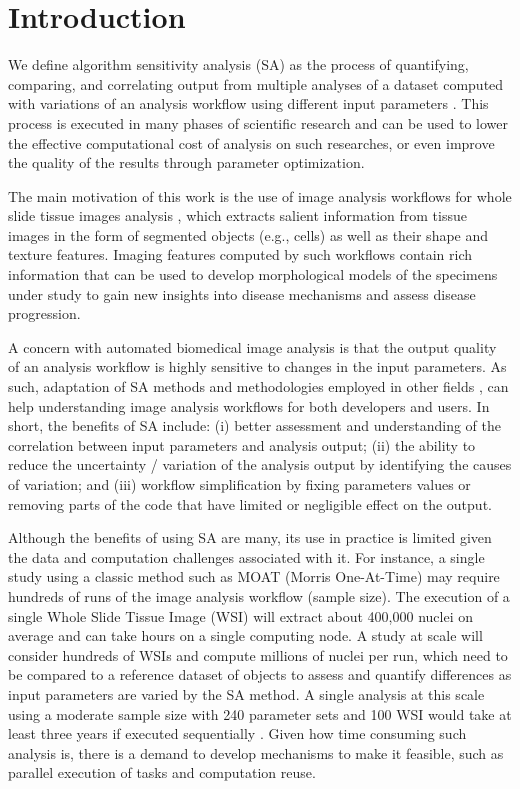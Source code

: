 \section{Introduction}

We define algorithm sensitivity analysis (SA) as the process of quantifying, comparing, and correlating output from multiple analyses of a dataset computed with variations of an analysis workflow using different input parameters \cite{sa}. This process is executed in many phases of scientific research and can be used to lower the effective computational cost of analysis on such researches, or even improve the quality of the results through parameter optimization.

The main motivation of this work is the use of image analysis workflows for whole slide tissue images analysis \cite{motiv1}, which extracts salient information from tissue images in the form of segmented objects (e.g., cells) as well as their shape and texture features. Imaging features computed by such workflows contain rich information that can be used to develop morphological models of the specimens under study to gain new insights into disease mechanisms and assess disease progression.

A concern with automated biomedical image analysis is that the output quality of an analysis workflow is highly sensitive to changes in the input parameters. As such, adaptation of SA methods and methodologies employed in other fields \cite{moat,vbd,motiv2,motiv3}, can help understanding image analysis workflows for both developers and users. In short, the benefits of SA include: (i) better assessment and understanding of the correlation between input parameters and analysis output; (ii) the ability to reduce the uncertainty / variation of the analysis output by identifying the causes of variation; and (iii) workflow simplification by fixing parameters values or removing parts of the code that have limited or negligible effect on the output.

Although the benefits of using SA are many, its use in practice is limited given the data and computation challenges associated with it. For instance, a single study using a classic method such as MOAT (Morris One-At-Time) \cite{moat} may require hundreds of runs of the image analysis workflow (sample size). The execution of a single Whole Slide Tissue Image (WSI) will extract about 400,000 nuclei on average and can take hours on a single computing node. A study at scale will consider hundreds of WSIs and compute millions of nuclei per run, which need to be compared to a reference dataset of objects to assess and quantify differences as input parameters are varied by the SA method. A single analysis at this scale using a moderate sample size with 240 parameter sets and 100 WSI would take at least three years if executed sequentially \cite{rtf1}. Given how time consuming such analysis is, there is a demand to develop mechanisms to make it feasible, such as parallel execution of tasks and computation reuse.

